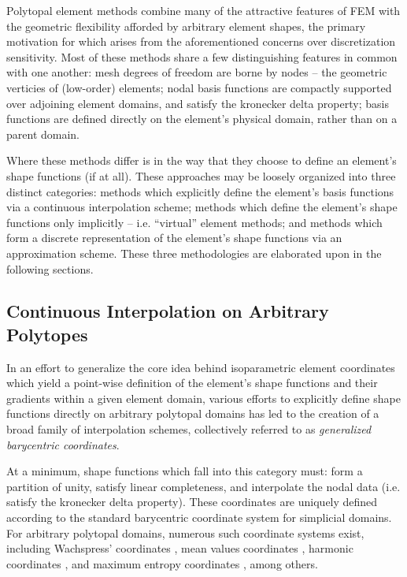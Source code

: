	Polytopal element methods combine many of the attractive features of FEM with the geometric flexibility afforded by arbitrary element shapes, the primary motivation for which arises from the aforementioned concerns over discretization sensitivity. Most of these methods share a few distinguishing features in common with one another: mesh degrees of freedom are borne by nodes -- the geometric verticies of (low-order) elements; nodal basis functions are compactly supported over adjoining element domains, and satisfy the kronecker delta property; basis functions are defined directly on the element's physical domain, rather than on a parent domain.
	
	Where these methods differ is in the way that they choose to define an element's shape functions (if at all). These approaches may be loosely organized into three distinct categories: methods which explicitly define the element's basis functions via a continuous interpolation scheme; methods which define the element's shape functions only implicitly -- i.e. ``virtual'' element methods; and methods which form a discrete representation of the element's shape functions via an approximation scheme. These three methodologies are elaborated upon in the following sections.

	\subsection{Continuous Interpolation on Arbitrary Polytopes}
		In an effort to generalize the core idea behind isoparametric element coordinates which yield a point-wise definition of the element's shape functions and their gradients within a given element domain, various efforts to explicitly define shape functions directly on arbitrary polytopal domains has led to the creation of a broad family of interpolation schemes, collectively referred to as \textit{generalized barycentric coordinates}.
		
		At a minimum, shape functions which fall into this category must: form a partition of unity, satisfy linear completeness, and interpolate the nodal data (i.e. satisfy the kronecker delta property). These coordinates are uniquely defined according to the standard barycentric coordinate system for simplicial domains. For arbitrary polytopal domains, numerous such coordinate systems exist, including Wachspress' coordinates \cite{Wachspress:75}, mean values coordinates \cite{Floater:03}, harmonic coordinates \cite{Joshi:07}, and maximum entropy coordinates \cite{Sukumar:04}, among others.
			
